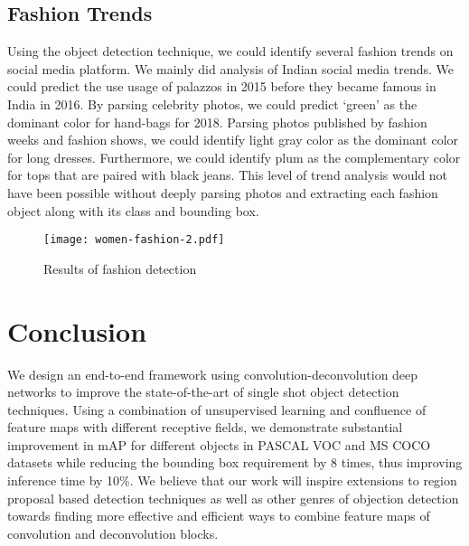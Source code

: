 \documentclass[sigconf]{acmart}
\begin{document}
\subsection{Fashion Trends}
Using the object detection technique,
we could identify several fashion trends
on social media platform.
We mainly did analysis of Indian social media trends.
We could predict the use usage of palazzos
in 2015 before they became famous in India in 2016.
By parsing celebrity photos,
we could predict `green' as the dominant color
for hand-bags for 2018.
Parsing photos published by fashion weeks and fashion shows,
we could identify light gray color as the dominant
color for long dresses.
Furthermore, we could identify plum as the complementary
color for tops that are paired with black jeans.
This level of trend analysis would not have been
possible without deeply parsing photos
and extracting each fashion object along with its class
and bounding box.



\begin{figure*}
\centering
\texttt{[image: women-fashion-2.pdf]}
\caption{Results of fashion detection}
\label{fig:ssd-stairnet-bssd}
\end{figure*}


\section{Conclusion}
We design an end-to-end 
framework using convolution-deconvolution
deep networks to improve the state-of-the-art
of single shot object detection techniques.
Using a combination of unsupervised learning
and confluence of feature maps with different receptive fields, 
we demonstrate substantial improvement in mAP for different objects
in PASCAL VOC and MS COCO datasets
while reducing the bounding box requirement by 8 times,
thus improving inference time by 10\%.
We believe that our work will inspire extensions
to region proposal based detection techniques
as well as other genres of objection detection
towards finding more effective and efficient ways to combine
feature maps of convolution and deconvolution blocks.
\end{document}
